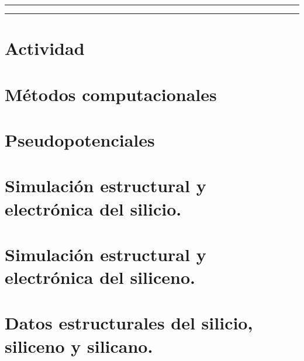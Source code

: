 








\tableofcontents			%
\newpage

\begin{center}
	\rule[0mm]{150mm}{0.1mm}		%
	\end{center}
	
	
\begin{abstract}		%
  
\end{abstract}
	
\begin{center}
	\rule[0mm]{150mm}{0.1mm}
	\end{center}

\section{Actividad}	
      
    
\section{Métodos computacionales}
    

\section{Pseudopotenciales}
    
                            
\section{Simulación estructural y electrónica del silicio.}	
      
    
\section{Simulación estructural y electrónica del siliceno.}	
         
    
\section{Datos estructurales del silicio, siliceno y silicano.}	
          

\newpage    

\nocite{*}


